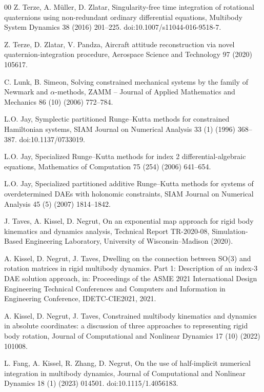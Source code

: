 \documentclass[preprint,12pt]{elsarticle}
\begin{document}
\begin{thebibliography}{00}
Z. Terze, A. M\"uller, D. Zlatar,
Singularity-free time integration of rotational quaternions using non-redundant ordinary
differential equations,
Multibody System Dynamics 38 (2016) 201--225.
doi:10.1007/s11044-016-9518-7.

Z. Terze, D. Zlatar, V. Pandza,
Aircraft attitude reconstruction via novel quaternion-integration procedure,
Aerospace Science and Technology 97 (2020) 105617.

C. Lunk, B. Simeon,
Solving constrained mechanical systems by the family of Newmark and $\alpha$-methods,
ZAMM -- Journal of Applied Mathematics and Mechanics 86 (10) (2006) 772--784.

L.O. Jay,
Symplectic partitioned Runge--Kutta methods for constrained Hamiltonian systems,
SIAM Journal on Numerical Analysis 33 (1) (1996) 368--387.
doi:10.1137/0733019.

L.O. Jay,
Specialized Runge--Kutta methods for index 2 differential-algebraic equations,
Mathematics of Computation 75 (254) (2006) 641--654.

L.O. Jay,
Specialized partitioned additive Runge--Kutta methods for systems of overdetermined DAEs with
holonomic constraints,
SIAM Journal on Numerical Analysis 45 (5) (2007) 1814--1842.

J. Taves, A. Kissel, D. Negrut,
On an exponential map approach for rigid body kinematics and dynamics analysis,
Technical Report TR-2020-08, Simulation-Based Engineering Laboratory, University of
Wisconsin--Madison (2020).

A. Kissel, D. Negrut, J. Taves,
Dwelling on the connection between SO(3) and rotation matrices in rigid multibody dynamics.
Part 1: Description of an index-3 DAE solution approach,
in: Proceedings of the ASME 2021 International Design Engineering Technical Conferences and
Computers and Information in Engineering Conference, IDETC-CIE2021, 2021.

A. Kissel, D. Negrut, J. Taves,
Constrained multibody kinematics and dynamics in absolute coordinates: a discussion of three
approaches to representing rigid body rotation,
Journal of Computational and Nonlinear Dynamics 17 (10) (2022) 101008.

L. Fang, A. Kissel, R. Zhang, D. Negrut,
On the use of half-implicit numerical integration in multibody dynamics,
Journal of Computational and Nonlinear Dynamics 18 (1) (2023) 014501.
doi:10.1115/1.4056183.


\end{thebibliography}
\end{document}
